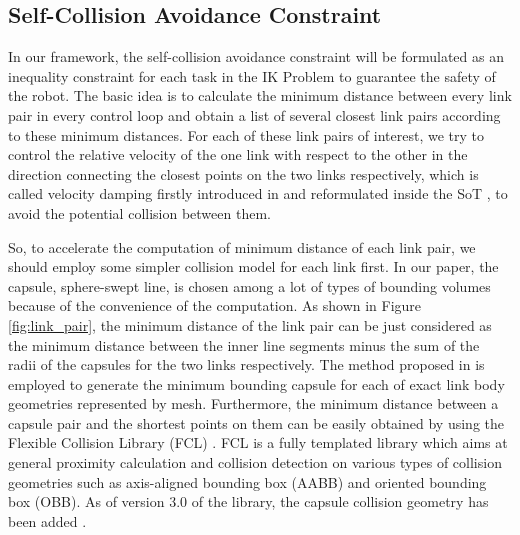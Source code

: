 
\subsection{Self-Collision Avoidance Constraint}
\label{sec:collision_avoidance}
In our framework, the self-collision avoidance constraint will be formulated as an inequality constraint for each task in the IK Problem to guarantee the safety of the robot. The basic idea is to calculate the minimum distance between every link pair in every control loop and obtain a list of several closest link pairs according to these minimum distances. For each of these link pairs of interest, we try to control the relative velocity of the one link with respect to the other in the direction connecting the closest points on the two links respectively, which is called velocity damping firstly introduced in \cite{1087982} and reformulated inside the SoT \cite{kanehiro2008local}, to avoid the potential collision between them. 

So, to accelerate the computation of minimum distance of each link pair, we should employ some simpler collision model for each link first. In our paper, the capsule, sphere-swept line, is chosen among a lot of types of bounding volumes because of the convenience of the computation. As shown in Figure \ref{fig:link_pair}, the minimum distance of the link pair can be just considered as the minimum distance between the inner line segments minus the sum of the radii of the capsules for the two links respectively. The method proposed in \cite{el2013optimal} is employed to generate the minimum bounding capsule for each of exact link body geometries represented by mesh. Furthermore, the minimum distance between a capsule pair and the shortest points on them can be easily obtained by using the Flexible Collision Library (FCL) \cite{6225337}. FCL is a fully templated library which aims at general proximity calculation and collision detection on various types of collision geometries such as axis-aligned bounding box (AABB) and oriented bounding box (OBB). As of version $3.0$ of the library, the capsule collision geometry has been added \cite{knese2014msc}.  

